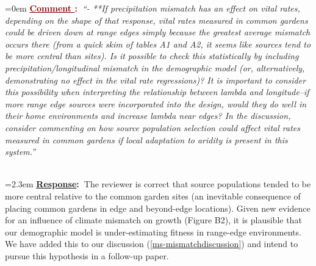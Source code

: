 \documentclass[12pt]{article}
\newcounter{cN}
\newcommand{\comment}[1]{
	\vspace{2em}
	\refstepcounter{cN} %
	\noindent \hangindent=0em \textbf{\textcolor{Maroon}{\uline{Comment \thecN}:~}}\emph{``#1''}
	}
\newcommand{\response}[1]{
	\\[0.25em]
	\hangindent=2.3em \textbf{\textcolor{NavyBlue}{\uline{Response}:~}}#1
	}
\begin{document}
\comment{- **If precipitation mismatch has an effect on vital rates, depending on the shape of that response, vital rates measured in common gardens could be driven down at range edges simply because the greatest average mismatch occurs there (from a quick skim of tables A1 and A2, it seems like sources tend to be more central than sites). Is it possible to check this statistically by including precipitation/longitudinal mismatch in the demographic model (or, alternatively, demonstrating no effect in the vital rate regressions)? It is important to consider this possibility when interpreting the relationship between lambda and longitude--if more range edge sources were incorporated into the design, would they do well in their home environments and increase lambda near edges? In the discussion, consider commenting on how source population selection could affect vital rates measured in common gardens if local adaptation to aridity is present in this system.}
\response{The reviewer is correct that source populations tended to be more central relative to the common garden sites (an inevitable consequence of placing common gardens in edge and beyond-edge locations). Given new evidence for an influence of climate mismatch on growth (Figure B2), it is plausible that our demographic model is under-estimating fitness in range-edge environments. We have added this to our discussion (\ref{ms-mismatchdiscussion}) and intend to pursue this hypothesis in a follow-up paper.}
\end{document}
